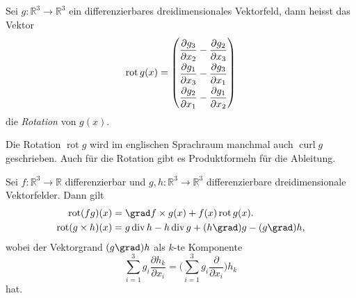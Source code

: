 \begin{definition}[Rotation]
Sei $g\colon\mathbb{R}^3\to\mathbb{R}^3$ ein differenzierbares
dreidimensionales Vektorfeld, dann heisst das Vektor
\[
\operatorname{rot}g(x)
=
{\renewcommand{\arraystretch}{1.9}
\begin{pmatrix}
\displaystyle
\frac{\partial g_3}{\partial x_2}
-
\frac{\partial g_2}{\partial x_3}
\\
\displaystyle
\frac{\partial g_1}{\partial x_3}
-
\frac{\partial g_3}{\partial x_1}
\\
\displaystyle
\frac{\partial g_2}{\partial x_1}
-
\frac{\partial g_1}{\partial x_2}
\end{pmatrix}}
\]
die {\em Rotation} von $g(x)$.
\end{definition}

Die Rotation $\operatorname{rot}g$ wird im englischen Sprachraum manchmal
auch $\operatorname{curl}g$ geschrieben.
Auch für die Rotation gibt es Produktformeln für die Ableitung.

\begin{satz}
\label{buch:felder:fundamentallemma:satz:rotprodukt}
Sei $f\colon\mathbb{R}^3\to\mathbb{R}$ differenzierbar und
$g,h\colon\mathbb{R}^3\to\mathbb{R}^3$ differenzierbare dreidimensionale
Vektorfelder.
Dann gilt
\begin{align*}
\operatorname{rot}(fg)(x)
&=
\grad f\times g(x) + f(x)\operatorname{rot}g(x).
\\
\operatorname{rot}(g\times h)(x)
&=
g\operatorname{div}h
-
h\operatorname{div}g
+
(h\grad)g
-
(g\grad)h,
\end{align*}
wobei der Vektorgrand $(g\grad)h$ als $k$-te Komponente
\[
\sum_{i=1}^3 g_i\frac{\partial h_k}{\partial x_i}
=
\biggl(
\sum_{i=1}^3 g_i\frac{\partial}{\partial x_i}
\biggr)h_k
\]
hat.
\end{satz}

